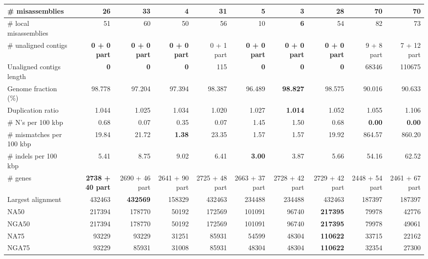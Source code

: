 \documentclass[12pt,a4paper]{article}
\begin{document}
\begin{table}[ht]
\begin{center}
\begin{tabular}{|l*{9}{|r}|}
\# misassemblies & 26 & 33 & 4 & 31 & 5 & {\bf 3} & 28 & 70 & 70 \\ \hline
\# local misassemblies & 51 & 60 & 50 & 56 & 10 & {\bf 6} & 54 & 82 & 73 \\ \hline
\# unaligned contigs & {\bf 0 + 0 part} & {\bf 0 + 0 part} & {\bf 0 + 0 part} & 0 + 1 part & {\bf 0 + 0 part} & {\bf 0 + 0 part} & {\bf 0 + 0 part} & 9 + 8 part & 7 + 12 part \\ \hline
Unaligned contigs length & {\bf 0} & {\bf 0} & {\bf 0} & 115 & {\bf 0} & {\bf 0} & {\bf 0} & 68346 & 110675 \\ \hline
Genome fraction (\%) & 98.778 & 97.204 & 97.394 & 98.387 & 96.489 & {\bf 98.827} & 98.575 & 90.016 & 90.633 \\ \hline
Duplication ratio & 1.044 & 1.025 & 1.034 & 1.020 & 1.027 & {\bf 1.014} & 1.052 & 1.055 & 1.106 \\ \hline
\# N's per 100 kbp & 0.68 & 0.07 & 0.35 & 0.07 & 1.45 & 1.50 & 0.68 & {\bf 0.00} & {\bf 0.00} \\ \hline
\# mismatches per 100 kbp & 19.84 & 21.72 & {\bf 1.38} & 23.35 & 1.57 & 1.57 & 19.92 & 864.57 & 860.20 \\ \hline
\# indels per 100 kbp & 5.41 & 8.75 & 9.02 & 6.41 & {\bf 3.00} & 3.87 & 5.66 & 54.16 & 62.52 \\ \hline
\# genes & {\bf 2738 + 40 part} & 2690 + 46 part & 2641 + 90 part & 2725 + 48 part & 2663 + 37 part & 2728 + 42 part & 2729 + 42 part & 2448 + 54 part & 2461 + 67 part \\ \hline
Largest alignment & 432463 & {\bf 432569} & 158329 & 432463 & 234488 & 234488 & 432463 & 187397 & 187397 \\ \hline
NA50 & 217394 & 178770 & 50192 & 172569 & 101091 & 96740 & {\bf 217395} & 79978 & 42776 \\ \hline
NGA50 & 217394 & 178770 & 50192 & 172569 & 101091 & 96740 & {\bf 217395} & 79978 & 49061 \\ \hline
NA75 & 93229 & 93229 & 31251 & 85931 & 54599 & 48304 & {\bf 110622} & 33715 & 22162 \\ \hline
NGA75 & 93229 & 85931 & 31008 & 85931 & 48304 & 48304 & {\bf 110622} & 32354 & 27300 \\ \hline
\end{tabular}
\end{center}
\end{table}
\end{document}
